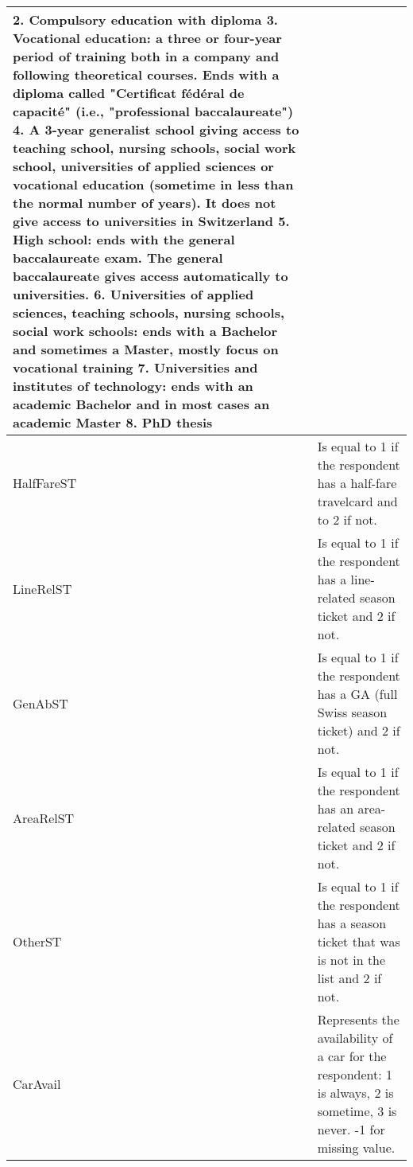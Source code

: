 \documentclass[12pt,a4paper]{article}
\begin{document}
\begin{longtable}{||p{4cm}|p{9cm}||}
2. Compulsory education with diploma
3. Vocational education: a three or four-year period of training both in a company and following theoretical courses. Ends with a diploma called "Certificat f\'ed\'eral de capacit\'e" (i.e., "professional baccalaureate")
4. A 3-year generalist school giving access to teaching school, nursing schools, social work school, universities of applied sciences or vocational education (sometime in less than the normal number of years). It does not give access to universities in Switzerland
5. High school: ends with the general baccalaureate exam. The general baccalaureate gives access automatically to universities.
6. Universities of applied sciences, teaching schools, nursing schools, social work schools: ends with a Bachelor and sometimes a Master, mostly focus on vocational training
7. Universities and institutes of technology: ends with an academic Bachelor and in most cases an academic Master
8. PhD thesis \tabularnewline
\hline
HalfFareST & Is equal to 1 if the respondent has a half-fare travelcard and to 2 if not.\tabularnewline
\hline
LineRelST & Is equal to 1 if the respondent has a line-related season ticket and 2 if not.\tabularnewline
\hline 
GenAbST & Is equal to 1 if the respondent has a GA (full Swiss season ticket) and 2 if not.\tabularnewline
\hline 
AreaRelST & Is equal to 1 if the respondent has an area-related season ticket and 2 if not.\tabularnewline
\hline
OtherST & Is equal to 1 if the respondent has a season ticket that was is not in the list and 2 if not.\tabularnewline
\hline 
CarAvail & Represents the availability of a car for the respondent: 1 is always, 2 is sometime, 3 is never. -1 for missing value.\tabularnewline
\hline 
\hline 
\end{longtable}

\clearpage
\end{document}
